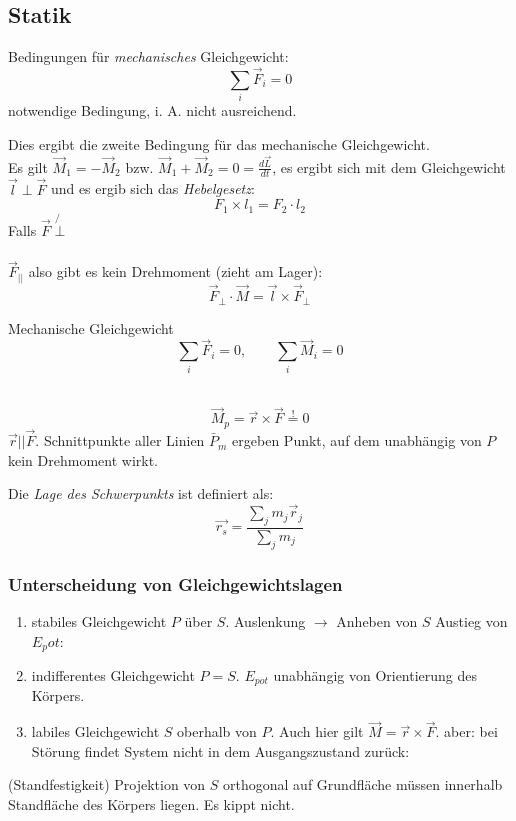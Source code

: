 \documentclass[a4paper,10pt]{scrartcl}
\begin{document}
\subsection{Statik}
Bedingungen für \emph{mechanisches} Gleichgewicht:\\
\[
 \sum_i \vec F_i =0
\]
notwendige Bedingung, i. A. nicht ausreichend.
\begin{ex}
Dies ergibt die zweite Bedingung für das mechanische Gleichgewicht.
\\
Es gilt $\vec M_1 = - \vec M_2$ bzw. $\vec M_1+ \vec M_2=0=\frac{d\vec L}{dt}$, es ergibt sich mit dem Gleichgewicht $\vec l \perp \vec F$ und es ergib sich das \emph{Hebelgesetz}:
\[
 \boxed{F_1 \times l_1 = F_2 \cdot l_2}
\]
Falls $\vec F \not{\perp}$ \fixme \\
\\
$\vec F_{||}$ also gibt es kein Drehmoment (zieht am Lager):
\[
 \vec F_\perp \cdot \vec M=\vec l \times  \vec F_\perp
\]
\begin{seg}{Mechanische Gleichgewicht}
 \[
  \sum_i \vec F_i=0, \qquad \sum_i \vec M_i=0
 \]
\end{seg}
\end{ex}
\begin{sg}
 \\
\[
 \vec M_p=\vec r \times \vec F\stackrel{!}= 0
\]
$\vec r ||\vec F$. Schnittpunkte aller Linien $\bar P_m$ ergeben Punkt, auf dem unabhängig von $P$ kein Drehmoment wirkt.
\end{sg}
\begin{df}
 Die \emph{Lage des Schwerpunkts} ist definiert als:
\[
 \vec{r_s}= \frac{\sum_j m_j \vec r_j}{\sum_j m_j}
\]
\end{df}
\subsubsection*{Unterscheidung von Gleichgewichtslagen}
\begin{enumerate}
 \item stabiles Gleichgewicht $P$ über $S$.  Auslenkung $\to $ Anheben von $S$ Austieg von $E_pot$:
 \item indifferentes Gleichgewicht $P=S$. $E_{pot}$ unabhängig von Orientierung des Körpers.
 \item labiles Gleichgewicht $S$ oberhalb von $P$. Auch hier gilt $\vec M= \vec r \times \vec F$. aber: bei Störung findet System nicht in dem Ausgangszustand zurück:
\end{enumerate}
\begin{sg}(Standfestigkeit)
Projektion von $S$ orthogonal auf Grundfläche müssen innerhalb Standfläche des Körpers liegen. Es kippt nicht.
\end{sg}
\end{document}

